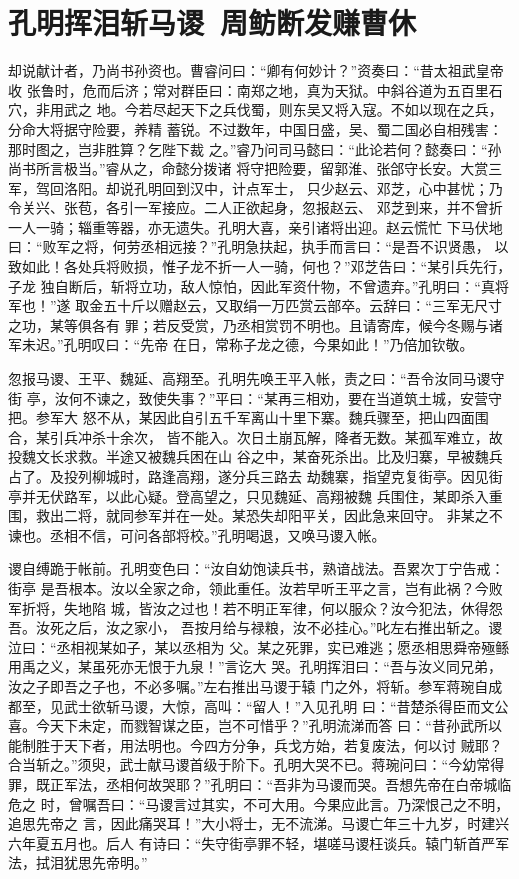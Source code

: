 \chapter{孔明挥泪斩马谡~周鲂断发赚曹休}

却说献计者，乃尚书孙资也。曹睿问曰：“卿有何妙计？”资奏曰：“昔太祖武皇帝收
张鲁时，危而后济；常对群臣曰：南郑之地，真为天狱。中斜谷道为五百里石穴，非用武之
地。今若尽起天下之兵伐蜀，则东吴又将入寇。不如以现在之兵，分命大将据守险要，养精
蓄锐。不过数年，中国日盛，吴、蜀二国必自相残害：那时图之，岂非胜算？乞陛下裁
之。”睿乃问司马懿曰：“此论若何？懿奏曰：“孙尚书所言极当。”睿从之，命懿分拨诸
将守把险要，留郭淮、张郃守长安。大赏三军，驾回洛阳。却说孔明回到汉中，计点军士，
只少赵云、邓芝，心中甚忧；乃令关兴、张苞，各引一军接应。二人正欲起身，忽报赵云、
邓芝到来，并不曾折一人一骑；辎重等器，亦无遗失。孔明大喜，亲引诸将出迎。赵云慌忙
下马伏地曰：“败军之将，何劳丞相远接？”孔明急扶起，执手而言曰：“是吾不识贤愚，
以致如此！各处兵将败损，惟子龙不折一人一骑，何也？”邓芝告曰：“某引兵先行，子龙
独自断后，斩将立功，敌人惊怕，因此军资什物，不曾遗弃。”孔明曰：“真将军也！”遂
取金五十斤以赠赵云，又取绢一万匹赏云部卒。云辞曰：“三军无尺寸之功，某等俱各有
罪；若反受赏，乃丞相赏罚不明也。且请寄库，候今冬赐与诸军未迟。”孔明叹曰：“先帝
在日，常称子龙之德，今果如此！”乃倍加钦敬。

忽报马谡、王平、魏延、高翔至。孔明先唤王平入帐，责之曰：“吾令汝同马谡守街
亭，汝何不谏之，致使失事？”平曰：“某再三相劝，要在当道筑土城，安营守把。参军大
怒不从，某因此自引五千军离山十里下寨。魏兵骤至，把山四面围合，某引兵冲杀十余次，
皆不能入。次日土崩瓦解，降者无数。某孤军难立，故投魏文长求救。半途又被魏兵困在山
谷之中，某奋死杀出。比及归寨，早被魏兵占了。及投列柳城时，路逢高翔，遂分兵三路去
劫魏寨，指望克复街亭。因见街亭并无伏路军，以此心疑。登高望之，只见魏延、高翔被魏
兵围住，某即杀入重围，救出二将，就同参军并在一处。某恐失却阳平关，因此急来回守。
非某之不谏也。丞相不信，可问各部将校。”孔明喝退，又唤马谡入帐。

谡自缚跪于帐前。孔明变色曰：“汝自幼饱读兵书，熟谙战法。吾累次丁宁告戒：街亭
是吾根本。汝以全家之命，领此重任。汝若早听王平之言，岂有此祸？今败军折将，失地陷
城，皆汝之过也！若不明正军律，何以服众？汝今犯法，休得怨吾。汝死之后，汝之家小，
吾按月给与禄粮，汝不必挂心。”叱左右推出斩之。谡泣曰：“丞相视某如子，某以丞相为
父。某之死罪，实已难逃；愿丞相思舜帝殛鲧用禹之义，某虽死亦无恨于九泉！”言讫大
哭。孔明挥泪曰：“吾与汝义同兄弟，汝之子即吾之子也，不必多嘱。”左右推出马谡于辕
门之外，将斩。参军蒋琬自成都至，见武士欲斩马谡，大惊，高叫：“留人！”入见孔明
曰：“昔楚杀得臣而文公喜。今天下未定，而戮智谋之臣，岂不可惜乎？”孔明流涕而答
曰：“昔孙武所以能制胜于天下者，用法明也。今四方分争，兵戈方始，若复废法，何以讨
贼耶？合当斩之。”须臾，武士献马谡首级于阶下。孔明大哭不已。蒋琬问曰：“今幼常得
罪，既正军法，丞相何故哭耶？”孔明曰：“吾非为马谡而哭。吾想先帝在白帝城临危之
时，曾嘱吾曰：“马谡言过其实，不可大用。今果应此言。乃深恨己之不明，追思先帝之
言，因此痛哭耳！”大小将士，无不流涕。马谡亡年三十九岁，时建兴六年夏五月也。后人
有诗曰：“失守街亭罪不轻，堪嗟马谡枉谈兵。辕门斩首严军法，拭泪犹思先帝明。”

